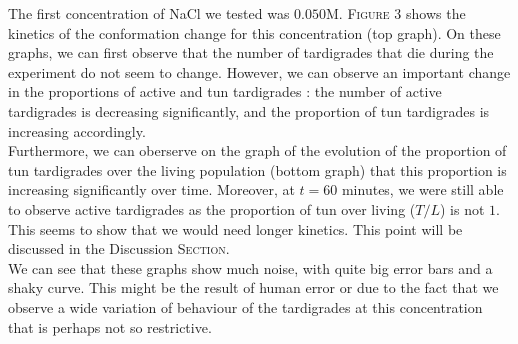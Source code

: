 \documentclass[12pt,a4paper, twocolumn]{article}
\begin{document}
The first concentration of NaCl we tested was $0.050$M. \textsc{Figure} 3 shows the kinetics of the conformation change for this concentration (top graph). On these graphs, we can first observe that the number of tardigrades that die during the experiment do not seem to change. However, we can observe an important change in the proportions of active and tun tardigrades : the number of active tardigrades is decreasing significantly, and the proportion of tun tardigrades is increasing accordingly.\\
Furthermore, we can oberserve on the graph of the evolution of the proportion of tun tardigrades over the living population (bottom graph) that this proportion is increasing significantly over time. Moreover, at $t=60$ minutes, we were still able to observe active tardigrades as the proportion of tun over living ($T/L$) is not $1$. This seems to show that we would need longer kinetics. This point will be discussed in the Discussion \textsc{Section}.\\
We can see that these graphs show much noise, with quite big error bars and a shaky curve. This might be the result of human error or due to the fact that we observe a wide variation of behaviour of the tardigrades at this concentration that is perhaps not so restrictive.
\end{document}
